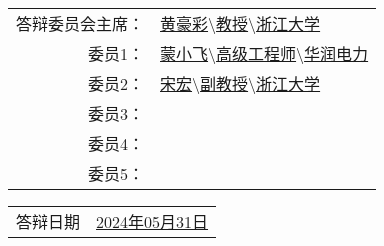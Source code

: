 \vskip 15pt

\begin{center}
    \begin{tabularx}{.91\textwidth}{>{\fangsong}r >{\fangsong}X<{\centering}}
        答辩委员会主席： & \uline{黄豪彩$\setminus$教授$\setminus$浙江大学\hfill} \\
        委员1： &  \uline{蒙小飞$\setminus$高级工程师$\setminus$华润电力\hfill} \\
        委员2： &  \uline{宋宏$\setminus$副教授$\setminus$浙江大学\hfill} \\%
        委员3： &  \uline{\hfill} \\
        委员4： &  \uline{\hfill} \\
        委员5： &  \uline{\hfill} \\
    \end{tabularx}
\end{center}

\vskip 15pt

\begin{center}
    \begin{tabularx}{.6\textwidth}{>{\fangsong}l >{\fangsong}X<{\centering}}
        答辩日期 & \uline{\hfill{2024年05月31日}\hfill}
    \end{tabularx}
\end{center}
